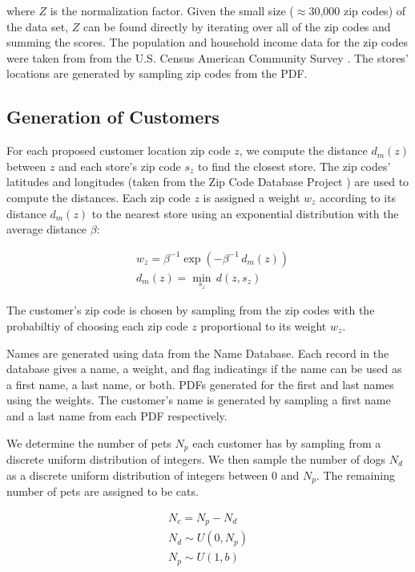 where $Z$ is the normalization factor.  Given the small size ($\approx$30,000 zip codes) of the data set, $Z$ can be found directly by iterating over all of the zip codes and summing the scores. The population and household income data for the zip codes were taken from from the U.S. Census American Community Survey \cite{ACS}.  The stores' locations are generated by sampling zip codes from the PDF.

\subsection{Generation of Customers}
For each proposed customer location zip code $z$, we compute the distance $d_m(z)$ between $z$ and each store's zip code $s_z$ to find the closest store.  The zip codes' latitudes and longitudes (taken from the Zip Code Database Project \cite{Zips}) are used to compute the distances. Each zip code $z$ is assigned a weight $w_z$ according to its distance $d_m(z)$ to the nearest store using an exponential distribution with the average distance $\beta$:

\begin{align*}
&w_z = \beta^{-1} \exp(-\beta^{-1} \, d_m(z)) \\
&d_m(z) = \min_{s_z} \, d(z, s_z)
\end{align*}

The customer's zip code is chosen by sampling from the zip codes with the probabiltiy of choosing each zip code $z$ proportional to its weight $w_z$.

Names are generated using data from the Name Database\cite{NameDB}. Each record in the database gives a name, a weight, and flag indicatings if the name can be used as a first name, a last name, or both.  PDFs generated for the first and last names using the weights.  The customer's name is generated by sampling a first name and a last name from each PDF respectively.

We determine the number of pets $N_p$ each customer has by sampling from a discrete uniform distribution of integers. We then sample the number of dogs $N_d$ as a discrete uniform distribution of integers between 0 and $N_p$.  The remaining number of pets are assigned to be cats.

\begin{align*}
N_c = N_p - N_d \\
N_d \sim U(0, N_p) \\
N_p \sim U(1, b)
\end{align*}

